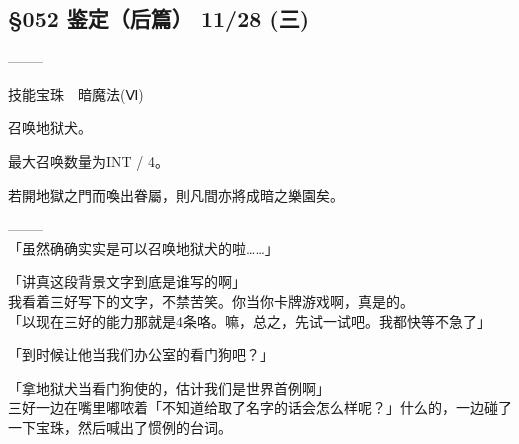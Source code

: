 \subsection{§052 鉴定（后篇） 11/28 (三)}

  --------

  技能宝珠　暗魔法(Ⅵ)

%  
 

  召唤地狱犬。

  最大召唤数量为INT / 4。

%  
 

  若開地獄之門而喚出眷屬，則凡間亦將成暗之樂園矣。

  --------\\

「虽然确确实实是可以召唤地狱犬的啦……」

「讲真这段背景文字到底是谁写的啊」\\

我看着三好写下的文字，不禁苦笑。你当你卡牌游戏啊，真是的。\\

「以现在三好的能力那就是4条咯。嘛，总之，先试一试吧。我都快等不急了」

「到时候让他当我们办公室的看门狗吧？」

「拿地狱犬当看门狗使的，估计我们是世界首例啊」\\

三好一边在嘴里嘟哝着「不知道给取了名字的话会怎么样呢？」什么的，一边碰了一下宝珠，然后喊出了惯例的台词。\\

